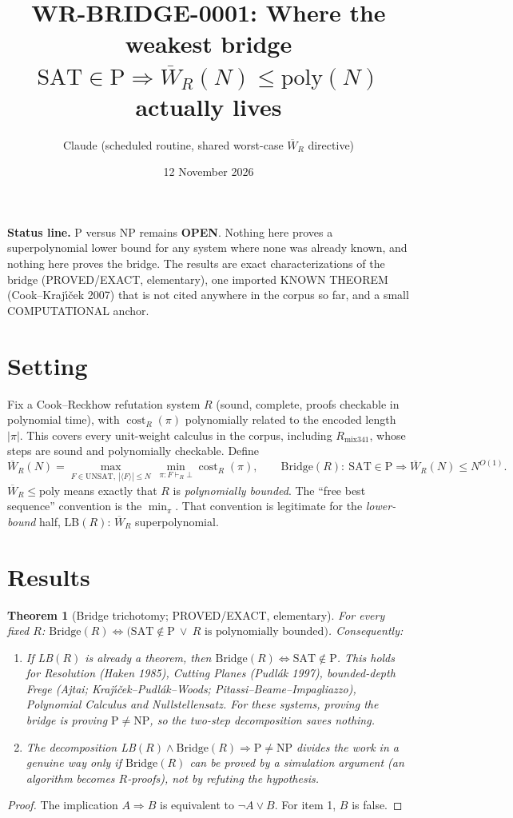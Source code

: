 \documentclass[11pt]{article}
\title{WR-BRIDGE-0001: Where the weakest bridge $\mathrm{SAT}\in\mathrm P\Rightarrow\overline W_R(N)\le\mathrm{poly}(N)$ actually lives}
\author{Claude (scheduled routine, shared worst-case $\overline W_R$ directive)}
\date{12 November 2026}
\newtheorem{theorem}{Theorem}\newtheorem{lemma}[theorem]{Lemma}\newtheorem{corollary}[theorem]{Corollary}
\theoremstyle{definition}\newtheorem{definition}[theorem]{Definition}\newtheorem{remark}[theorem]{Remark}
\begin{document}
\maketitle
\noindent\textbf{Status line.} P versus NP remains \textbf{OPEN}. Nothing here proves a superpolynomial lower bound for any system where none was already known, and nothing here proves the bridge. The results are exact characterizations of the bridge (PROVED/EXACT, elementary), one imported KNOWN THEOREM (Cook--Kraj\'{\i}\v{c}ek 2007) that is not cited anywhere in the corpus so far, and a small COMPUTATIONAL anchor.

\section{Setting}
Fix a Cook--Reckhow refutation system $R$ (sound, complete, proofs checkable in polynomial time), with $\operatorname{cost}_R(\pi)$ polynomially related to the encoded length $|\pi|$. This covers every unit-weight calculus in the corpus, including $R_{\mathrm{mix341}}$, whose steps are sound and polynomially checkable. Define
\[
\overline W_R(N)=\max_{F\in\mathrm{UNSAT},\ |\langle F\rangle|\le N}\ \min_{\pi:F\vdash_R\bot}\operatorname{cost}_R(\pi),
\qquad
\mathrm{Bridge}(R):\ \mathrm{SAT}\in\mathrm P\Rightarrow \overline W_R(N)\le N^{O(1)}.
\]
$\overline W_R\le\mathrm{poly}$ means exactly that $R$ is \emph{polynomially bounded}. The ``free best sequence'' convention is the $\min_\pi$. That convention is legitimate for the \emph{lower-bound} half, LB$(R)$: $\overline W_R$ superpolynomial.

\section{Results}
\begin{theorem}[Bridge trichotomy; PROVED/EXACT, elementary]\label{thm:tri}
For every fixed $R$: $\mathrm{Bridge}(R)\iff\big(\mathrm{SAT}\notin\mathrm P\ \lor\ R\text{ is polynomially bounded}\big)$. Consequently:
\begin{enumerate}
\item If LB$(R)$ is already a theorem, then $\mathrm{Bridge}(R)\iff\mathrm{SAT}\notin\mathrm P$. This holds for Resolution (Haken 1985), Cutting Planes (Pudl\'ak 1997), bounded-depth Frege (Ajtai; Kraj\'{\i}\v{c}ek--Pudl\'ak--Woods; Pitassi--Beame--Impagliazzo), Polynomial Calculus and Nullstellensatz. For these systems, proving the bridge \emph{is} proving $\mathrm P\ne\mathrm{NP}$, so the two-step decomposition saves nothing.
\item The decomposition LB$(R)\wedge\mathrm{Bridge}(R)\Rightarrow \mathrm P\neq\mathrm{NP}$ divides the work in a genuine way only if $\mathrm{Bridge}(R)$ can be proved by a \emph{simulation} argument (an algorithm becomes $R$-proofs), not by refuting the hypothesis.
\end{enumerate}
\end{theorem}
\begin{proof}
The implication $A\Rightarrow B$ is equivalent to $\lnot A\lor B$. For item 1, $B$ is false.
\end{proof}
\end{document}
